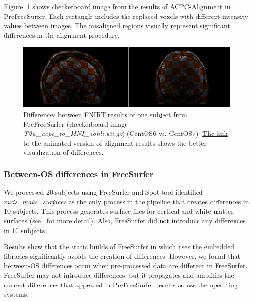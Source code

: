 \documentclass[a4paper,num-refs]{oup-contemporary}
\begin{document}
Figure~\ref{fig:fnirt_result} 
shows checkerboard image from the results of ACPC-Alignment in PreFreeSurfer. 
Each rectangle includes the replaced voxels with different intensity values between images.
The misaligned regions visually represent significant differences in the alignment 
procedure.


\begin{figure}
  \centering
    \includegraphics[width=\columnwidth]{images/t2w_alignment.png} 
    \caption{Differences between FNIRT results of one subject from PreFreeSurfer 
    (checkerboard image \emph{T2w\_acpc\_to\_MNI\_nonli.nii.gz}) (CentOS6 vs. 
    CentOS7).
    \href{https://github.com/ali4006/HCP-reproducibility-paper/blob/master/images/pfs_t2w_alignment.gif}
    {The link} to the animated version of alignment results shows the better visualization of differences.
} 
    \label{fig:fnirt_result}
\end{figure}


\subsubsection{Between-OS differences in FreeSurfer} 

We processed 20 subjects using FreeSurfer and 
Spot tool identified \emph{mris\_make\_surfaces} as the only process in 
the pipeline that creates differences in 10 subjects.
This process generates surface files for cortical and white matter surfaces 
(see~\cite{fischl2012freesurfer} for more detail). 
Also, FreeSurfer did not introduce any differences in 10 subjects. 

Results show that the static builds of FreeSurfer in which uses the embedded libraries 
significantly avoids the creation of differences.
However, we found that between-OS differences occur when pre-processed data are different in FreeSurfer. 
FreeSurfer may not introduce differences, but it propagates and amplifies 
the current differences that appeared in PreFreeSurfer results across the operating systems.
\end{document}
